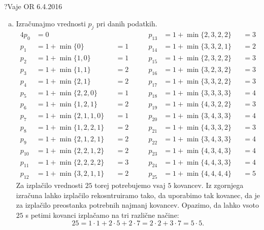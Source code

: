 \begin{naloga}{?}{Vaje OR 6.4.2016}
\begin{odgovor}
\begin{enumerate}[(a)]
\item Izračunajmo vrednosti $p_j$ pri danih podatkih.
\begin{alignat*}{4}
p_0    &= 0                      &&    &\qquad
p_{13} &= 1 + \min\{2, 3, 2, 2\} &&= 3 \\
p_1    &= 1 + \min\{0\}          &&= 1 &\qquad
p_{14} &= 1 + \min\{3, 3, 2, 1\} &&= 2 \\
p_2    &= 1 + \min\{1, 0\}       &&= 1 &\qquad
p_{15} &= 1 + \min\{2, 3, 2, 2\} &&= 3 \\
p_3    &= 1 + \min\{1, 1\}       &&= 2 &\qquad
p_{16} &= 1 + \min\{3, 2, 3, 2\} &&= 3 \\
p_4    &= 1 + \min\{2, 1\}       &&= 2 &\qquad
p_{17} &= 1 + \min\{3, 3, 2, 2\} &&= 3 \\
p_5    &= 1 + \min\{2, 2, 0\}    &&= 1 &\qquad
p_{18} &= 1 + \min\{3, 3, 3, 3\} &&= 4 \\
p_6    &= 1 + \min\{1, 2, 1\}    &&= 2 &\qquad
p_{19} &= 1 + \min\{4, 3, 2, 2\} &&= 3 \\
p_7    &= 1 + \min\{2, 1, 1, 0\} &&= 1 &\qquad
p_{20} &= 1 + \min\{3, 4, 3, 3\} &&= 4 \\
p_8    &= 1 + \min\{1, 2, 2, 1\} &&= 2 &\qquad
p_{21} &= 1 + \min\{4, 3, 3, 2\} &&= 3 \\
p_9    &= 1 + \min\{2, 1, 2, 1\} &&= 2 &\qquad
p_{22} &= 1 + \min\{3, 4, 3, 3\} &&= 4 \\
p_{10} &= 1 + \min\{2, 2, 1, 2\} &&= 2 &\qquad
p_{23} &= 1 + \min\{4, 3, 4, 3\} &&= 4 \\
p_{11} &= 1 + \min\{2, 2, 2, 2\} &&= 3 &\qquad
p_{24} &= 1 + \min\{4, 4, 3, 3\} &&= 4 \\
p_{12} &= 1 + \min\{3, 2, 1, 1\} &&= 2 &\qquad
p_{25} &= 1 + \min\{4, 4, 4, 4\} &&= 5
\end{alignat*}
Za izplačilo vrednosti $25$ torej potrebujemo vsaj $5$ kovancev.
Iz zgornjega izračuna lahko izplačilo rekosntruiramo tako,
da uporabimo tak kovanec,
da je za izplačilo preostanka potrebnih najmanj kovancev.
Opazimo,
da lahko vsoto $25$ s petimi kovanci izplačamo na tri različne načine:
$$
25 = 1 \cdot 1 + 2 \cdot 5 + 2 \cdot 7
   = 2 \cdot 2 + 3 \cdot 7
   = 5 \cdot 5 .
$$
\end{enumerate}
\end{odgovor}
\end{naloga}
